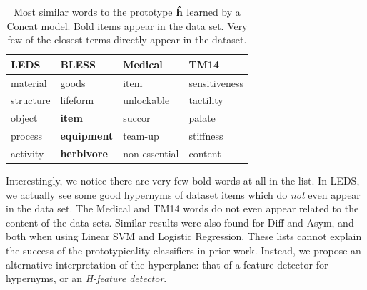 \begin{table}[t]
\begin{center}
  \begin{tabular}{|llll|}
    \hline
    {\bf LEDS} & {\bf BLESS} & {\bf Medical} & {\bf TM14}\\
    \hline
     material       &      goods             &     item           &      sensitiveness          \\
     structure      &      lifeform          &     unlockable     &      tactility              \\
     object         & {\bf item}             &     succor         &      palate                 \\
     process        & {\bf equipment}        &     team-up        &      stiffness              \\
     activity       & {\bf herbivore}        &     non-essential  &      content                \\
    \hline
  \end{tabular}
\end{center}
\caption{Most similar words to the prototype ${\mathbf{\hat h}}$ learned by a Concat model. Bold items
appear in the data set. Very few of the closest terms directly appear in the dataset.}
\label{tab:wordsim}
\end{table}

Interestingly, we notice there are very few bold words at all in the list.  In
LEDS, we actually see some good hypernyms of dataset items which do {\em not}
even appear in the data set. The Medical and TM14 words do not even appear
related to the content of the data sets. Similar results were also found for
Diff and Asym, and both when using Linear SVM and Logistic Regression. These
lists cannot explain the success of the prototypicality classifiers in prior
work. Instead, we propose an alternative interpretation of the hyperplane: that
of a feature detector for hypernyms, or an {\em H-feature detector}.

